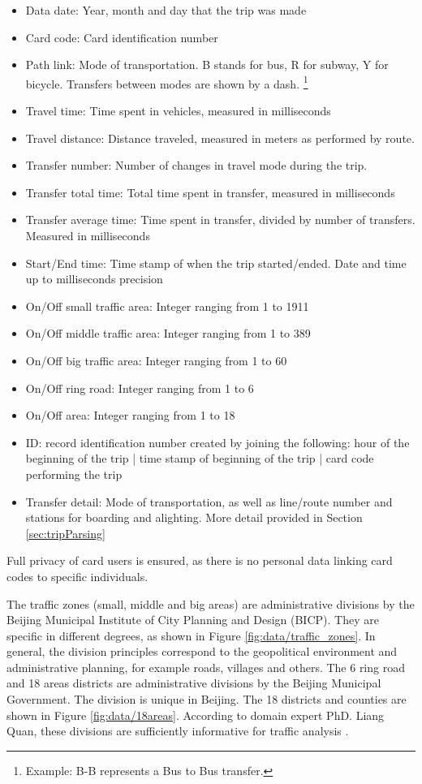 \documentclass{article}
\begin{document}
\begin{itemize}
\item Data date: Year, month and day that the trip was made
\item Card code: Card identification number
\item Path link: Mode of transportation. B stands for bus, R for subway, Y for bicycle. Transfers between modes are shown by a dash. \footnote{Example: B-B represents a Bus to Bus transfer.} 
\item Travel time: Time spent in vehicles, measured in milliseconds
\item Travel distance: Distance traveled, measured in meters as performed by route. 
\item Transfer number: Number of changes in travel mode during the trip. 
\item Transfer total time: Total time spent in transfer, measured in milliseconds\item Transfer average time: Time spent in transfer, divided by number of transfers. Measured in milliseconds
\item Start/End time: Time stamp of when the trip started/ended. Date and time up to milliseconds precision
\item On/Off small traffic area: Integer ranging from 1 to 1911
\item On/Off middle traffic area: Integer ranging from 1 to 389
\item On/Off big traffic area: Integer ranging from 1 to 60
\item On/Off ring road: Integer ranging from 1 to 6
\item On/Off area: Integer ranging from 1 to 18
\item ID: record identification number created by joining the following: hour of the beginning of the trip | time stamp of beginning of the trip | card code performing the trip
\item Transfer detail: Mode of transportation, as well as line/route number and stations for boarding and alighting. More detail provided in Section \ref{sec:tripParsing}
\end{itemize}

Full privacy of card users is ensured, as there is no personal data linking card codes to specific individuals. 

The traffic zones (small, middle and big areas) are administrative divisions by the Beijing Municipal Institute of City Planning and Design (BICP). They are specific in different degrees, as shown in Figure \ref{fig:data/traffic_zones}. In general, the division principles correspond to the geopolitical environment and administrative planning, for example roads, villages and others. The 6 ring road and 18 areas districts are administrative divisions by the Beijing Municipal Government. The division is unique in Beijing. The 18 districts and counties are shown in Figure \ref{fig:data/18areas}. According to domain expert PhD. Liang Quan, these divisions are sufficiently informative for traffic analysis \cite{liang}.
\end{document}
